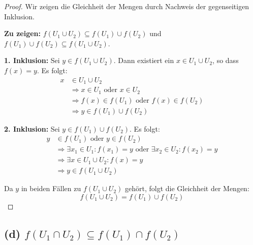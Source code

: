 \documentclass[12pt]{article}
\begin{document}
\begin{proof}
	Wir zeigen die Gleichheit der Mengen durch Nachweis der gegenseitigen Inklusion.

	\textbf{Zu zeigen:} \( f(U_1 \cup U_2) \subseteq f(U_1) \cup f(U_2) \) und \( f(U_1) \cup f(U_2) \subseteq f(U_1 \cup U_2) \).

	\textbf{1. Inklusion:} Sei \( y \in f(U_1 \cup U_2) \). Dann existiert ein \( x \in U_1 \cup U_2 \), so dass \( f(x) = y \). Es folgt:
	\begin{align*}
		x & \in U_1 \cup U_2                                          \\
		  & \Rightarrow x \in U_1 \text{ oder } x \in U_2             \\
		  & \Rightarrow f(x) \in f(U_1) \text{ oder } f(x) \in f(U_2) \\
		  & \Rightarrow y \in f(U_1) \cup f(U_2)
	\end{align*}

	\textbf{2. Inklusion:} Sei \( y \in f(U_1) \cup f(U_2) \). Es folgt:
	\begin{align*}
		y & \in f(U_1) \text{ oder } y \in f(U_2)                                                       \\
		  & \Rightarrow \exists x_1 \in U_1 : f(x_1) = y \text{ oder } \exists x_2 \in U_2 : f(x_2) = y \\
		  & \Rightarrow \exists x \in U_1 \cup U_2 : f(x) = y                                           \\
		  & \Rightarrow y \in f(U_1 \cup U_2)
	\end{align*}

	Da \( y \) in beiden Fällen zu \( f(U_1 \cup U_2) \) gehört, folgt die Gleichheit der Mengen:
	\[ f(U_1 \cup U_2) = f(U_1) \cup f(U_2) \]
\end{proof}

\subsection*{(d) \( f(U_1 \cap U_2) \subseteq f(U_1) \cap f(U_2) \)}
\end{document}
